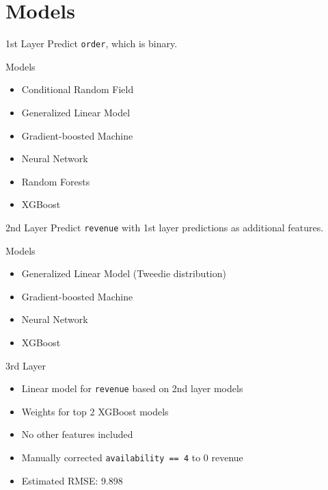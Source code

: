 \documentclass{beamer}
\begin{document}
\section{Models} %

\begin{frame}{1st Layer}
  Predict \texttt{order}, which is binary.
  \begin{block}{Models}
    \begin{itemize}
      \item Conditional Random Field
      \item Generalized Linear Model
      \item \textcolor{lgray}{Gradient-boosted Machine}
      \item Neural Network
      \item Random Forests
      \item XGBoost
    \end{itemize}
  \end{block}
\end{frame}

\begin{frame}{2nd Layer}
  Predict \texttt{revenue} with 1st layer predictions as additional features.
  \begin{block}{Models}
    \begin{itemize}
      \item \textcolor{lgray}{Generalized Linear Model (Tweedie distribution)}
      \item \textcolor{lgray}{Gradient-boosted Machine}
      \item \textcolor{lgray}{Neural Network}
      \item XGBoost
    \end{itemize}
  \end{block}
\end{frame}

\begin{frame}{3rd Layer}
  \begin{itemize}
    \item Linear model for \texttt{revenue} based on 2nd layer models
    \item Weights for top 2 XGBoost models
    \item No other features included
    \item Manually corrected \texttt{availability == 4} to 0 revenue
    \item Estimated RMSE: 9.898
  \end{itemize}
\end{frame}
\end{document}
